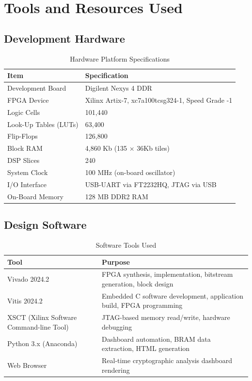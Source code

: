 \documentclass[12pt,a4paper]{article}
\begin{document}
\section{Tools and Resources Used}

\subsection{Development Hardware}

\begin{table}[H]
\centering
\caption{Hardware Platform Specifications}
\begin{tabularx}{\textwidth}{lX}
\toprule
\textbf{Item} & \textbf{Specification} \\
\midrule
Development Board      & Digilent Nexys 4 DDR \\
FPGA Device            & Xilinx Artix-7, xc7a100tcsg324-1, Speed Grade -1 \\
Logic Cells            & 101,440 \\
Look-Up Tables (LUTs)  & 63,400 \\
Flip-Flops             & 126,800 \\
Block RAM              & 4,860 Kb (135 × 36Kb tiles) \\
DSP Slices             & 240 \\
System Clock           & 100 MHz (on-board oscillator) \\
I/O Interface          & USB-UART via FT2232HQ, JTAG via USB \\
On-Board Memory        & 128 MB DDR2 RAM \\
\bottomrule
\end{tabularx}
\end{table}

\subsection{Design Software}

\begin{table}[H]
\centering
\caption{Software Tools Used}
\begin{tabularx}{\textwidth}{lX}
\toprule
\textbf{Tool} & \textbf{Purpose} \\
\midrule
Vivado 2024.2           & FPGA synthesis, implementation, bitstream generation, block design \\
Vitis 2024.2            & Embedded C software development, application build, FPGA programming \\
XSCT (Xilinx Software Command-line Tool) & JTAG-based memory read/write, hardware debugging \\
Python 3.x (Anaconda)   & Dashboard automation, BRAM data extraction, HTML generation \\
Web Browser             & Real-time cryptographic analysis dashboard rendering \\
\bottomrule
\end{tabularx}
\end{table}
\end{document}
